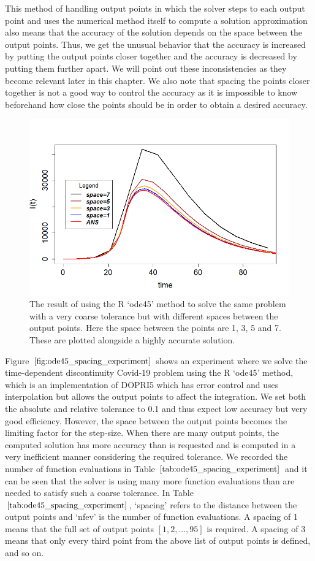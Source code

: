 This method of handling output points in which the solver steps to each output point and uses the numerical method itself to compute a solution approximation also means that the accuracy of the solution depends on the space between the output points. Thus, we get the unusual behavior that the accuracy is increased by putting the output points closer together and the accuracy is decreased by putting them further apart. We will point out these inconsistencies as they become relevant later in this chapter. We also note that spacing the points closer together is not a good way to control the accuracy as it is impossible to know beforehand how close the points should be in order to obtain a desired accuracy.

\begin{figure}[H]
\centering
\includegraphics[width=0.7\linewidth]{./figures/R_ode45_spacing_experiment}
\caption{The result of using the R `ode45' method to solve the same problem with a very coarse tolerance but with different spaces between the output points. Here the space between the points are 1, 3, 5 and 7. These are plotted alongside a highly accurate solution.}
\label{fig:ode45_spacing_experiment}
\end{figure}

Figure $\ref{fig:ode45_spacing_experiment}$ shows an experiment where we solve the time-dependent discontinuity Covid-19 problem using the R `ode45' method, which is an implementation of DOPRI5 which has error control and uses interpolation but allows the output points to affect the integration. We set both the absolute and relative tolerance to 0.1 and thus expect low accuracy but very good efficiency. However, the space between the output points becomes the limiting factor for the step-size. When there are many output points, the computed solution has more accuracy than is requested and is computed in a very inefficient manner considering the required tolerance. We recorded the number of function evaluations in Table $\ref{tab:ode45_spacing_experiment}$ and it can be seen that the solver is using many more function evaluations than are needed to satisfy such a coarse tolerance. In Table $\ref{tab:ode45_spacing_experiment}$, `spacing' refers to the distance between the output points and `nfev' is the number of function evaluations. A spacing of 1 means that the full set of output points $[1, 2, ..., 95]$ is required. A spacing of 3 means that only every third point from the above list of output points is defined, and so on.

